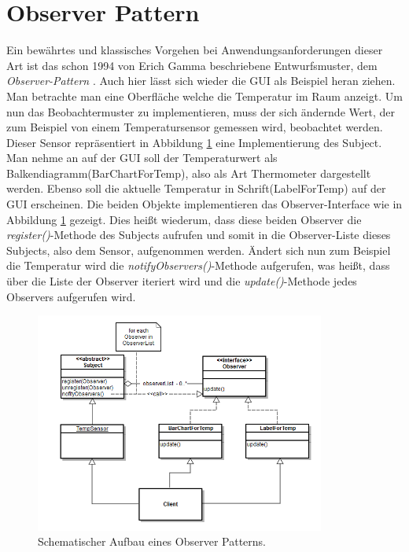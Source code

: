 \section{Observer Pattern}
Ein bewährtes und klassisches Vorgehen bei Anwendungsanforderungen dieser Art ist das schon 1994 von Erich Gamma beschriebene Entwurfsmuster, dem \textit{Observer-Pattern} \cite{Gamma.2011}. Auch hier lässt sich wieder die GUI als Beispiel heran ziehen. Man betrachte man eine Oberfläche welche die Temperatur im Raum anzeigt. Um nun das Beobachtermuster zu implementieren, muss der sich ändernde Wert, der zum Beispiel von einem Temperatursensor gemessen wird, beobachtet werden. Dieser Sensor repräsentiert in Abbildung \ref{pic:observerpattern} eine Implementierung des Subject. Man nehme an auf der GUI soll der Temperaturwert als Balkendiagramm(BarChartForTemp), also als Art Thermometer dargestellt werden. Ebenso soll die aktuelle Temperatur in Schrift(LabelForTemp) auf der GUI erscheinen. Die beiden Objekte implementieren das Observer-Interface wie in Abbildung \ref{pic:observerpattern} gezeigt. Dies heißt wiederum, dass diese beiden Observer die \textit{register()}-Methode des Subjects aufrufen und somit in die Observer-Liste dieses Subjects, also dem Sensor, aufgenommen werden. Ändert sich nun zum Beispiel die Temperatur wird die \textit{notifyObservers()}-Methode aufgerufen, was heißt, dass über die Liste der Observer iteriert wird und die \textit{update()}-Methode jedes Observers aufgerufen wird.
\begin{figure}
	\centering
	\includegraphics[width=0.85\textwidth]{Abb/observerpattern_self}
	\caption{Schematischer Aufbau eines Observer Patterns.}
	\label{pic:observerpattern}
\end{figure}

